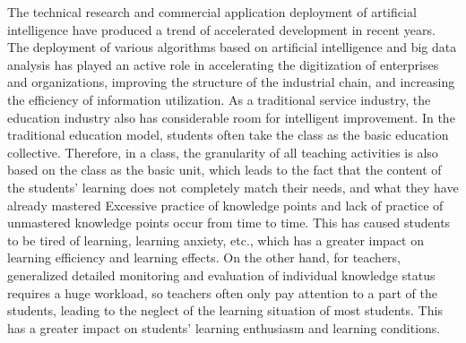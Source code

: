 
The technical research and commercial application deployment of artificial intelligence have produced a trend of accelerated development in recent years. The deployment of various algorithms based on artificial intelligence and big data analysis has played an active role in accelerating the digitization of enterprises and organizations, improving the structure of the industrial chain, and increasing the efficiency of information utilization. As a traditional service industry, the education industry also has considerable room for intelligent improvement. In the traditional education model, students often take the class as the basic education collective. Therefore, in a class, the granularity of all teaching activities is also based on the class as the basic unit, which leads to the fact that the content of the students' learning does not completely match their needs, and what they have already mastered Excessive practice of knowledge points and lack of practice of unmastered knowledge points occur from time to time. This has caused students to be tired of learning, learning anxiety, etc., which has a greater impact on learning efficiency and learning effects. On the other hand, for teachers, generalized detailed monitoring and evaluation of individual knowledge status requires a huge workload, so teachers often only pay attention to a part of the students, leading to the neglect of the learning situation of most students. This has a greater impact on students' learning enthusiasm and learning conditions.

